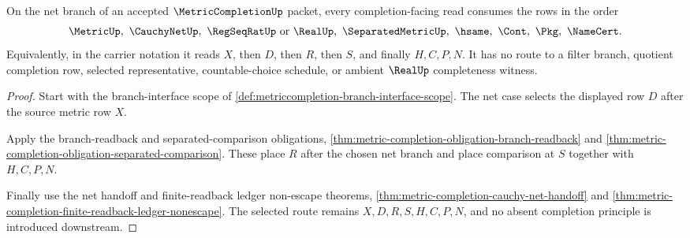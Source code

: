 \begin{theorem}
\label{thm:metriccompletion-net-branch-scope}
On the net branch of an accepted $\MetricCompletionUp$ packet, every completion-facing read consumes the rows in the order
$$
\MetricUp,\ \CauchyNetUp,\ \RegSeqRatUp\hbox{ or }\RealUp,\ \SeparatedMetricUp,\ \hsame,\ \Cont,\ \Pkg,\ \NameCert .
$$
Equivalently, in the carrier notation it reads $X$, then $D$, then $R$, then $S$, and finally $H,C,P,N$. It has no route to a filter branch, quotient completion row, selected representative, countable-choice schedule, or ambient $\RealUp$ completeness witness.
\end{theorem}
\begin{proof}
Start with the branch-interface scope of \autoref{def:metriccompletion-branch-interface-scope}. The net case selects the displayed row $D$ after the source metric row $X$.

Apply the branch-readback and separated-comparison obligations, \autoref{thm:metric-completion-obligation-branch-readback} and \autoref{thm:metric-completion-obligation-separated-comparison}. These place $R$ after the chosen net branch and place comparison at $S$ together with $H,C,P,N$.

Finally use the net handoff and finite-readback ledger non-escape theorems, \autoref{thm:metric-completion-cauchy-net-handoff} and \autoref{thm:metric-completion-finite-readback-ledger-nonescape}. The selected route remains $X,D,R,S,H,C,P,N$, and no absent completion principle is introduced downstream.
\end{proof}

